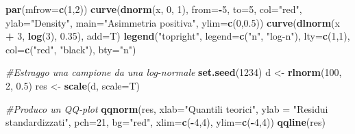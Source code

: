 \documentclass[a4paper,12pt,oneside]{book}
\newenvironment{Shaded}{\begin{snugshade}}{\end{snugshade}}
\newcommand{\KeywordTok}[1]{\textcolor[rgb]{0.13,0.29,0.53}{\textbf{#1}}}
\newcommand{\DataTypeTok}[1]{\textcolor[rgb]{0.13,0.29,0.53}{#1}}
\newcommand{\DecValTok}[1]{\textcolor[rgb]{0.00,0.00,0.81}{#1}}
\newcommand{\FloatTok}[1]{\textcolor[rgb]{0.00,0.00,0.81}{#1}}
\newcommand{\StringTok}[1]{\textcolor[rgb]{0.31,0.60,0.02}{#1}}
\newcommand{\CommentTok}[1]{\textcolor[rgb]{0.56,0.35,0.01}{\textit{#1}}}
\newcommand{\OperatorTok}[1]{\textcolor[rgb]{0.81,0.36,0.00}{\textbf{#1}}}
\newcommand{\NormalTok}[1]{#1}
\theoremstyle{definition}
\theoremstyle{definition}
\theoremstyle{definition}
\theoremstyle{remark}
\begin{document}
\begin{Shaded}
\begin{Highlighting}[]
\KeywordTok{par}\NormalTok{(}\DataTypeTok{mfrow=}\KeywordTok{c}\NormalTok{(}\DecValTok{1}\NormalTok{,}\DecValTok{2}\NormalTok{))}
\KeywordTok{curve}\NormalTok{(}\KeywordTok{dnorm}\NormalTok{(x, }\DecValTok{0}\NormalTok{, }\DecValTok{1}\NormalTok{), }\DataTypeTok{from=}\OperatorTok{-}\DecValTok{5}\NormalTok{, }\DataTypeTok{to=}\DecValTok{5}\NormalTok{, }\DataTypeTok{col=}\StringTok{"red"}\NormalTok{,}
      \DataTypeTok{ylab=}\StringTok{"Density"}\NormalTok{, }\DataTypeTok{main=}\StringTok{"Asimmetria positiva"}\NormalTok{,}
      \DataTypeTok{ylim=}\KeywordTok{c}\NormalTok{(}\DecValTok{0}\NormalTok{,}\FloatTok{0.5}\NormalTok{))}
\KeywordTok{curve}\NormalTok{(}\KeywordTok{dlnorm}\NormalTok{(x }\OperatorTok{+}\StringTok{ }\DecValTok{3}\NormalTok{, }\KeywordTok{log}\NormalTok{(}\DecValTok{3}\NormalTok{), }\FloatTok{0.35}\NormalTok{), }\DataTypeTok{add=}\NormalTok{T)}
\KeywordTok{legend}\NormalTok{(}\StringTok{"topright"}\NormalTok{, }\DataTypeTok{legend=}\KeywordTok{c}\NormalTok{(}\StringTok{"n"}\NormalTok{, }\StringTok{"log-n"}\NormalTok{),}
       \DataTypeTok{lty=}\KeywordTok{c}\NormalTok{(}\DecValTok{1}\NormalTok{,}\DecValTok{1}\NormalTok{), }\DataTypeTok{col=}\KeywordTok{c}\NormalTok{(}\StringTok{"red"}\NormalTok{, }\StringTok{"black"}\NormalTok{), }\DataTypeTok{bty=}\StringTok{"n"}\NormalTok{)}

\CommentTok{#Estraggo una campione da una log-normale}
\KeywordTok{set.seed}\NormalTok{(}\DecValTok{1234}\NormalTok{)}
\NormalTok{d <-}\StringTok{ }\KeywordTok{rlnorm}\NormalTok{(}\DecValTok{100}\NormalTok{, }\DecValTok{2}\NormalTok{, }\FloatTok{0.5}\NormalTok{)}
\NormalTok{res <-}\StringTok{ }\KeywordTok{scale}\NormalTok{(d, }\DataTypeTok{scale=}\NormalTok{T)}

\CommentTok{#Produco un QQ-plot}
\KeywordTok{qqnorm}\NormalTok{(res, }\DataTypeTok{xlab=}\StringTok{"Quantili teorici"}\NormalTok{, }
     \DataTypeTok{ylab =} \StringTok{"Residui  standardizzati"}\NormalTok{, }
     \DataTypeTok{pch=}\DecValTok{21}\NormalTok{, }\DataTypeTok{bg=}\StringTok{"red"}\NormalTok{, }\DataTypeTok{xlim=}\KeywordTok{c}\NormalTok{(}\OperatorTok{-}\DecValTok{4}\NormalTok{,}\DecValTok{4}\NormalTok{), }\DataTypeTok{ylim=}\KeywordTok{c}\NormalTok{(}\OperatorTok{-}\DecValTok{4}\NormalTok{,}\DecValTok{4}\NormalTok{))}
\KeywordTok{qqline}\NormalTok{(res)}
\end{Highlighting}
\end{Shaded}
\end{document}
